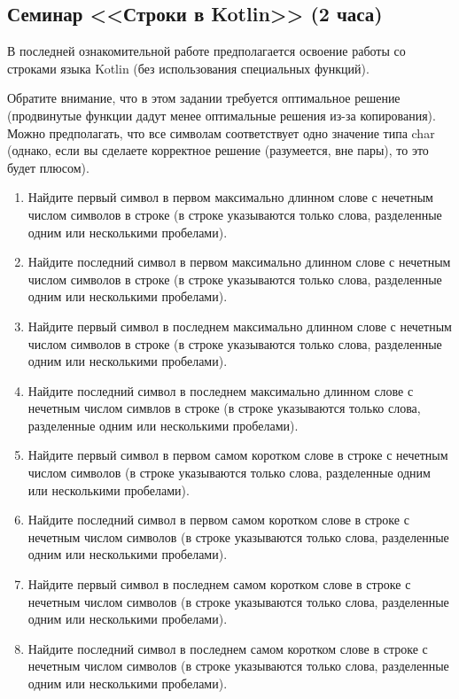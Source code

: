 \subsection{Семинар <<Строки в Kotlin>> (2 часа)}

В последней ознакомительной работе предполагается освоение работы со строками языка Kotlin (без использования специальных функций).

Обратите внимание, что в этом задании требуется оптимальное решение 
(продвинутые функции дадут менее оптимальные решения из-за копирования). Можно предполагать,
что все символам соответствует одно значение типа char (однако,
если вы сделаете корректное решение (разумеется, вне пары), то это будет плюсом).



\begin{enumerate}
\item Найдите первый символ в первом максимально длинном слове с нечетным числом символов в строке (в строке указываются только слова, разделенные одним или несколькими пробелами). 
\item Найдите последний символ в первом максимально длинном слове с нечетным числом символов в строке (в строке указываются только слова, разделенные одним или несколькими пробелами). 
\item Найдите первый символ в последнем максимально длинном слове с нечетным числом символов в строке (в строке указываются только слова, разделенные одним или несколькими пробелами). 
\item Найдите последний символ в последнем максимально длинном слове с нечетным числом симвлов в строке (в строке указываются только слова, разделенные одним или несколькими пробелами). 
\item Найдите первый символ в первом самом коротком слове в строке с нечетным числом символов (в строке указываются только слова, разделенные одним или несколькими пробелами). 
\item Найдите последний символ в первом самом коротком слове в строке с нечетным числом символов (в строке указываются только слова, разделенные одним или несколькими пробелами). 
\item Найдите первый символ в последнем самом коротком слове в строке с нечетным числом символов (в строке указываются только слова, разделенные одним или несколькими пробелами). 
\item Найдите последний символ в последнем самом коротком слове в строке с нечетным числом символов (в строке указываются только слова, разделенные одним или несколькими пробелами). 


\end{enumerate}
